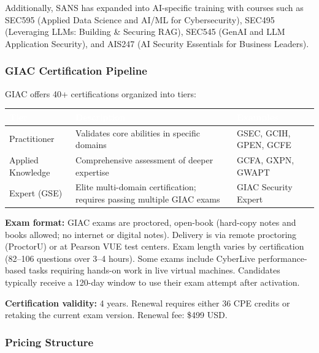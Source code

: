 \documentclass[11pt,letterpaper]{article}
\newcommand{\tableheader}[1]{\textbf{\sffamily\textcolor{white}{#1}}}
\begin{document}
Additionally, SANS has expanded into AI-specific training with courses such as SEC595 (Applied Data Science and AI/ML for Cybersecurity), SEC495 (Leveraging LLMs: Building \& Securing RAG), SEC545 (GenAI and LLM Application Security), and AIS247 (AI Security Essentials for Business Leaders).

\subsubsection{GIAC Certification Pipeline}

GIAC offers 40+ certifications organized into tiers:

\begin{center}
\begin{tabularx}{\textwidth}{L{3cm}XL{3cm}}
\toprule
{}
\tableheader{Tier} & \tableheader{Description} & \tableheader{Examples} \\
\midrule
Practitioner & Validates core abilities in specific domains & GSEC, GCIH, GPEN, GCFE \\
Applied Knowledge & Comprehensive assessment of deeper expertise & GCFA, GXPN, GWAPT \\
Expert (GSE) & Elite multi-domain certification; requires passing multiple GIAC exams & GIAC Security Expert \\
\bottomrule
\end{tabularx}
\end{center}

\textbf{Exam format:} GIAC exams are proctored, open-book (hard-copy notes and books allowed; no internet or digital notes). Delivery is via remote proctoring (ProctorU) or at Pearson VUE test centers. Exam length varies by certification (82--106 questions over 3--4 hours). Some exams include CyberLive performance-based tasks requiring hands-on work in live virtual machines. Candidates typically receive a 120-day window to use their exam attempt after activation.

\textbf{Certification validity:} 4 years. Renewal requires either 36 CPE credits or retaking the current exam version. Renewal fee: \$499 USD.

\subsubsection{Pricing Structure}
\end{document}

